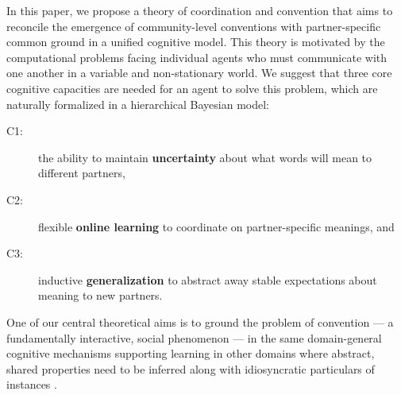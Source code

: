 In this paper, we propose a theory of coordination and convention that aims to reconcile the emergence of community-level conventions with partner-specific common ground in a unified cognitive model.
This theory is motivated by the computational problems facing individual agents who must communicate with one another in a variable and non-stationary world. 
We suggest that three core cognitive capacities are needed for an agent to solve this problem, which are naturally formalized in a hierarchical Bayesian model:
\begin{description}
\item[C1:] the ability to maintain \textbf{uncertainty} about what words will mean to different partners,
\item[C2:] flexible  \textbf{online learning} to coordinate on partner-specific meanings, and
\item[C3:] inductive \textbf{generalization} to abstract away stable expectations about meaning to new partners.
\end{description}
One of our central theoretical aims is to ground the problem of convention --- a fundamentally interactive, social phenomenon --- in the same domain-general cognitive mechanisms supporting learning in other domains where abstract, shared properties need to be inferred along with idiosyncratic particulars of instances \cite{berniker2008estimating,GoodmanUllmanTenenbaum11_TheoryOfCausality,tenenbaum_how_2011,kleinschmidt2015robust}.

